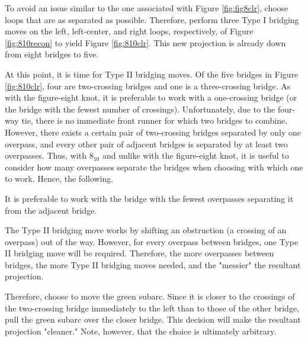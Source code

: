 \documentclass[titlepage,11pt]{article}
\begin{document}
To avoid an issue similar to the one associated with Figure \ref{fig:fig8clr}, choose loops that are as separated as possible. Therefore, perform three Type I bridging moves on the left, left-center, and right loops, respectively, of Figure \ref{fig:810recon} to yield Figure \ref{fig:810clr}. This new projection is already down from eight bridges to five.\par
At this point, it is time for Type II bridging moves. Of the five bridges in Figure \ref{fig:810clr}, four are two-crossing bridges and one is a three-crossing bridge. As with the figure-eight knot, it is preferable to work with a one-crossing bridge (or the bridge with the fewest number of crossings). Unfortunately, due to the four-way tie, there is no immediate front runner for which two bridges to combine. However, there exists a certain pair of two-crossing bridges separated by only one overpass, and every other pair of adjacent bridges is separated by at least two overpasses. Thus, with $8_{10}$ and unlike with the figure-eight knot, it is useful to consider how many overpasses separate the bridges when choosing with which one to work. Hence, the following.\par

\begin{conj}
    It is preferable to work with the bridge with the fewest overpasses separating it from the adjacent bridge.
\end{conj}

The Type II bridging move works by shifting an obstruction (a crossing of an overpass) out of the way. However, for every overpass between bridges, one Type II bridging move will be required. Therefore, the more overpasses between bridges, the more Type II bridging moves needed, and the "messier" the resultant projection.\par
Therefore, choose to move the \textcolor{grx}{green} subarc. Since it is closer to the crossings of the two-crossing bridge immediately to the left than to those of the other bridge, pull the \textcolor{grx}{green} subarc over the closer bridge. This decision will make the resultant projection "cleaner." Note, however, that the choice is ultimately arbitrary.\par
\end{document}

